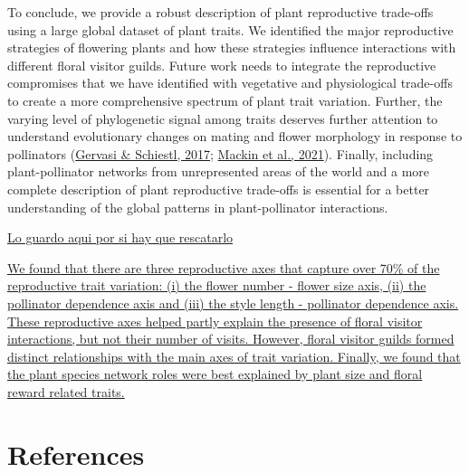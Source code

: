 \documentclass[
  12pt,
  a4paper,
]{article}
\begin{document}
To conclude, we provide a robust description of plant reproductive trade-offs using a large global dataset of plant traits. We identified the major reproductive strategies of flowering plants and how these strategies influence interactions with different floral visitor guilds. Future work needs to integrate the reproductive compromises that we have identified with vegetative and physiological trade-offs to create a more comprehensive spectrum of plant trait variation. Further, the varying level of phylogenetic signal among traits deserves further attention to understand evolutionary changes on mating and flower morphology in response to pollinators (\protect\hyperlink{ref-gervasi2017}{Gervasi \& Schiestl, 2017}; \protect\hyperlink{ref-mackin2021}{Mackin et al., 2021}). Finally, including plant-pollinator networks from unrepresented areas of the world and a more complete description of plant reproductive trade-offs is essential for a better understanding of the global patterns in plant-pollinator interactions.

\href{Jose}{Lo guardo aqui por si hay que rescatarlo}

\href{old\%20text}{We found that there are three reproductive axes that capture over 70\% of the reproductive trait variation: (i) the flower number - flower size axis, (ii) the pollinator dependence axis and (iii) the style length - pollinator dependence axis. These reproductive axes helped partly explain the presence of floral visitor interactions, but not their number of visits. However, floral visitor guilds formed distinct relationships with the main axes of trait variation. Finally, we found that the plant species network roles were best explained by plant size and floral reward related traits.}

\hypertarget{references}{%
\section{References}\label{references}}
\end{document}
